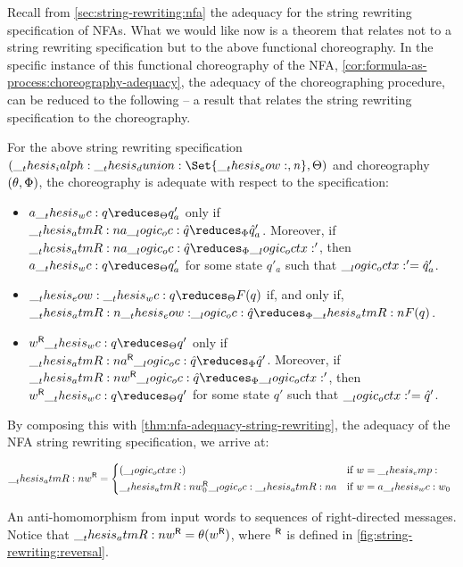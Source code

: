 Recall from \cref{sec:string-rewriting:nfa} the adequacy  for the string rewriting specification of \acp{NFA}.
%
\nfaadequacystringrewriting*
%
What we would like now is a theorem that relates  not to a string rewriting specification but to the above functional choreography.
In the specific instance of this functional choreography of the \ac{NFA}, \cref{cor:formula-as-process:choreography-adequacy}, the adequacy of the choreographing procedure, can be reduced to the following  -- a result that relates the string rewriting specification to the choreography.
\begin{corollary}\label{cor:chor-nfa-adequacy}
  For the above string rewriting specification $(\ialph \dunion \Set{\eow, \symrej}, \srsig)$ and choreography $(\theta, \Phi)$, the choreography is adequate with respect to the specification:
  \begin{itemize}[nosep]
  \item
    $a \wc q \reduces_{\srsig} q'_a$ only if $\atmR{a} \oc \defp{q} \reduces_{\orsig} \defp{q}'_a$.
    Moreover, if $\atmR{a} \oc \defp{q} \reduces_{\orsig} \octx'$, then $a \wc q \reduces_{\srsig} q'_a$ for some state $q'_a$ such that $\__logic_octx:' = \hat{q}'_a$.
  \item
    $\eow \wc q \reduces_{\srsig} F(q)$ if, and only if, $\atmR{\eow} \oc \defp{q} \reduces_{\orsig} \atmR{F}(q)$.
  \item
    $\rev{w} \wc q \reduces_{\srsig} q'$ only if $\rev{\atmR{a}} \oc \defp{q} \reduces_{\orsig} \defp{q}'$.
    Moreover, if $\rev{\atmR{w}} \oc \defp{q} \reduces_{\orsig} \octx'$, then $\rev{w} \wc q \reduces_{\srsig} q'$ for some state $q'$ such that $\__logic_octx:' = \hat{q}'$.
  \end{itemize}
\end{corollary}
%
\noindent By composing this with \cref{thm:nfa-adequacy-string-rewriting}, the adequacy of the \ac{NFA} string rewriting specification, we arrive at:
%
\begin{marginfigure}
  \begin{equation*}
    \rev{\atmR{w}} =
      \begin{cases*}
        (\octxe) & if $w = \emp$ \\
        \rev{\atmR{w}_0} \oc \atmR{a} & if $w = a \wc w_0$
      \end{cases*}
  \end{equation*}
  \caption{An anti-homomorphism from input words to sequences of right-directed messages.
    Notice that $\rev{\atmR{w}} = \theta(\rev{w})$, where $\rev{}$ is defined in \cref{fig:string-rewriting:reversal}.}\label{fig:formula-as-process:msg-rev}
\end{marginfigure}%
